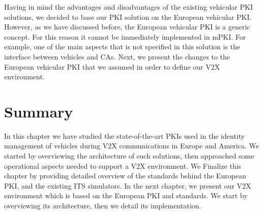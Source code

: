 Having in mind the advantages and disadvantages of the existing vehicular PKI solutions, we decided to base our PKI solution on the European vehicular PKI. However, as we have discussed before, the European vehicular PKI is a generic concept. For this reason it cannot be immediately implemented in mPKI. For example, one of the main aspects that is not specified in this solution is the interface between vehicles and CAs. Next, we present the changes to the European vehicular PKI that we assumed in order to define our V2X environment.

\section{Summary}
In this chapter we have studied the state-of-the-art PKIs used in the identity management of vehicles during V2X communications in Europe and America. We started by overviewing the architecture of such solutions, then approached some operational aspects needed to support a V2X environment. We Finalize this chapter by providing detailed overview of the standards behind the European PKI, and the existing ITS simulators. In the next chapter, we present our V2X environment which is based on the European PKI and standards. We start by overviewing its architecture, then we detail its implementation.